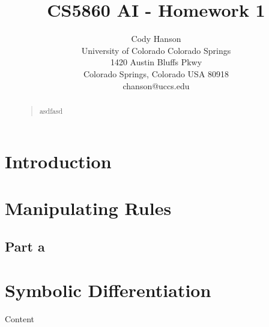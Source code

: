 \documentclass[letterpaper]{article}
\begin{document}
\title{CS5860 AI - Homework 1}
\author{Cody Hanson\\
University of Colorado Colorado Springs\\
1420 Austin Bluffs Pkwy\\
Colorado Springs, Colorado USA 80918\\
chanson@uccs.edu}
\maketitle
\begin{abstract}
\begin{quote}
asdfasd
\end{quote}
\end{abstract}

\section{Introduction}

\section{Manipulating Rules}

\subsection{Part a}

\section{Symbolic Differentiation}

Content
\end{document}
